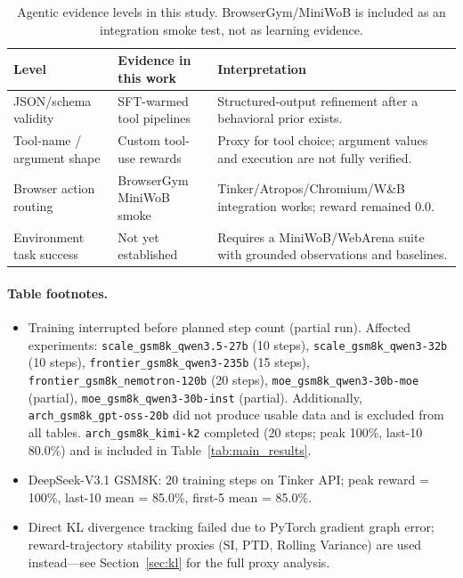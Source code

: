 \documentclass{article}
\begin{document}
\begin{table}[htbp]
\centering
\caption{Agentic evidence levels in this study. BrowserGym/MiniWoB is included
as an integration smoke test, not as learning evidence.}
\label{tab:agentic_levels}
\small
\begin{tabular}{@{}p{3.2cm}p{4.1cm}p{5.0cm}@{}}
\toprule
\textbf{Level} & \textbf{Evidence in this work} & \textbf{Interpretation} \\
\midrule
JSON/schema validity & SFT-warmed tool pipelines & Structured-output refinement after a behavioral prior exists.\\
Tool-name / argument shape & Custom tool-use rewards & Proxy for tool choice; argument values and execution are not fully verified.\\
Browser action routing & BrowserGym MiniWoB smoke & Tinker/Atropos/Chromium/W\&B integration works; reward remained 0.0.\\
Environment task success & Not yet established & Requires a MiniWoB/WebArena suite with grounded observations and baselines.\\
\bottomrule
\end{tabular}
\end{table}

\paragraph{Table footnotes.}
\begin{itemize}
    \item[$^\dagger$] Training interrupted before planned step count (partial run).
    Affected experiments:
    \texttt{scale\_gsm8k\_qwen3.5-27b} (10 steps), \texttt{scale\_gsm8k\_qwen3-32b} (10 steps),
    \texttt{frontier\_gsm8k\_qwen3-235b} (15 steps), \texttt{frontier\_gsm8k\_nemotron-120b} (20 steps),
    \texttt{moe\_gsm8k\_qwen3-30b-moe} (partial), \texttt{moe\_gsm8k\_qwen3-30b-inst} (partial).
    Additionally, \texttt{arch\_gsm8k\_gpt-oss-20b} did not produce usable data and is excluded
    from all tables. \texttt{arch\_gsm8k\_kimi-k2} completed (20 steps; peak 100\%, last-10 80.0\%)
    and is included in Table~\ref{tab:main_results}.
    \item[$^b$] DeepSeek-V3.1 GSM8K: 20 training steps on Tinker API;
    peak reward = 100\%, last-10 mean = 85.0\%, first-5 mean = 85.0\%.
    \item[$^h$] Direct KL divergence tracking failed due to PyTorch gradient graph error;
    reward-trajectory stability proxies (SI, PTD, Rolling Variance) are used
    instead---see Section~\ref{sec:kl} for the full proxy analysis.
\end{itemize}
\end{document}
